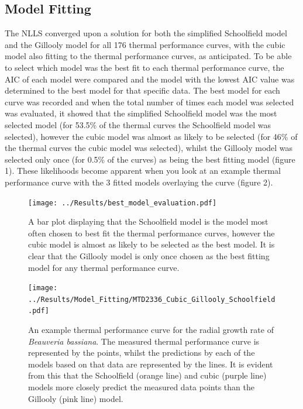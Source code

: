 \documentclass[11pt]{article}
\begin{document}
\begin{linenumbers}
\subsection{Model Fitting}
The NLLS converged upon a solution for both the simplified Schoolfield model and the Gillooly model for all 176 thermal performance curves, with the cubic model also fitting to the thermal performance curves, as anticipated. To be able to select which model was the best fit to each thermal performance curve, the AIC of each model were compared and the model with the lowest AIC value was determined to the best model for that specific data. The best model for each curve was recorded and when the total number of times each model was selected was evaluated, it showed that the simplified Schoolfield model was the most selected model (for 53.5\% of the thermal curves the Schoolfield model was selected), however the cubic model was almost as likely to be selected (for 46\% of the thermal curves the cubic model was selected), whilst the Gillooly model was selected only once (for 0.5\% of the curves) as being the best fitting model (figure 1). These likelihoods become apparent when you look at an example thermal performance curve with the 3 fitted models overlaying the curve (figure 2).

\begin{figure}[H]
    \centering
    \texttt{[image: ../Results/best\_model\_evaluation.pdf]}
    \caption{A bar plot displaying that the Schoolfield model is the model most often chosen to best fit the thermal performance curves, however the cubic model is almost as likely to be selected as the best model. It is clear that the Gillooly model is only once chosen as the best fitting model for any thermal performance curve.}
    \label{Figure 1}
\end{figure}
\FloatBarrier

\begin{figure}[H]
    \centering
    \texttt{[image: ../Results/Model\_Fitting/MTD2336\_Cubic\_Gillooly\_Schoolfield.pdf]}
    \caption{An example thermal performance curve for the radial growth rate of \textit{Beauveria bassiana}. The measured thermal performance curve is represented by the points, whilst the predictions by each of the models based on that data are represented by the lines. It is evident from this that the Schoolfield (orange line) and cubic (purple line) models more closely predict the measured data points than the Gillooly (pink line) model.}
    \label{Figure 2}
\end{figure}
\FloatBarrier


\end{linenumbers}
\end{document}
